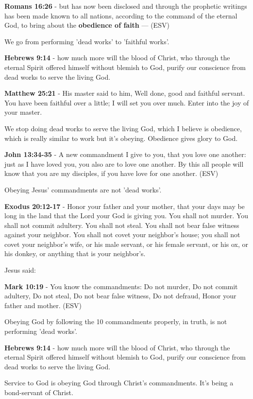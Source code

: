 \documentclass[11pt]{article}
\begin{document}
\textbf{Romans 16:26} - but has now been disclosed and through the prophetic writings has been made known to all nations, according to the command of the eternal God, to bring about the \textbf{obedience of faith} — (ESV)

We go from performing 'dead works' to 'faithful works'.

\textbf{Hebrews 9:14} - how much more will the blood of Christ, who through the eternal Spirit offered himself without blemish to God, purify our conscience from dead works to serve the living God.

\textbf{Matthew 25:21} - His master said to him, Well done, good and faithful servant. You have been faithful over a little; I will set you over much. Enter into the joy of your master.

We stop doing dead works to serve the living God, which I believe is obedience,
which is really similar to work but it's obeying. Obedience gives glory to God.

\textbf{John 13:34-35} - A new commandment I give to you, that you love one another: just as I have loved you, you also are to love one another. By this all people will know that you are my disciples, if you have love for one another. (ESV)

Obeying Jesus' commandments are not 'dead works'.

\textbf{Exodus 20:12-17} - Honor your father and your mother, that your days may be long in the land that the Lord your God is giving you. You shall not murder. You shall not commit adultery. You shall not steal. You shall not bear false witness against your neighbor. You shall not covet your neighbor's house; you shall not covet your neighbor's wife, or his male servant, or his female servant, or his ox, or his donkey, or anything that is your neighbor's.

Jesus said:

\textbf{Mark 10:19} - You know the commandments: Do not murder, Do not commit adultery, Do not steal, Do not bear false witness, Do not defraud, Honor your father and mother. (ESV)

Obeying God by following the 10 commandments properly, in truth, is not performing 'dead works'.

\textbf{Hebrews 9:14} - how much more will the blood of Christ, who through the eternal Spirit offered himself without blemish to God, purify our conscience from dead works to serve the living God.

Service to God is obeying God through Christ's commandments. It's being a bond-servant of Christ.
\end{document}
